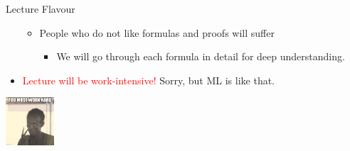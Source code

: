 \begin{frame}{Lecture Flavour}
\begin{itemize}
\begin{itemize}
    \item People who do not like formulas and proofs will suffer
        \begin{itemize}
        \pause \item We will go through each formula in detail for deep understanding.
        \end{itemize}
    \end{itemize}
    \pause \item \textcolor{red}{Lecture will be work-intensive!} Sorry, but ML is like that.
\end{itemize}
\vspace{-1.9cm}
\hfill
\includegraphics[height=1.8cm]{img/must_work_hard.jpeg}
\end{frame}

